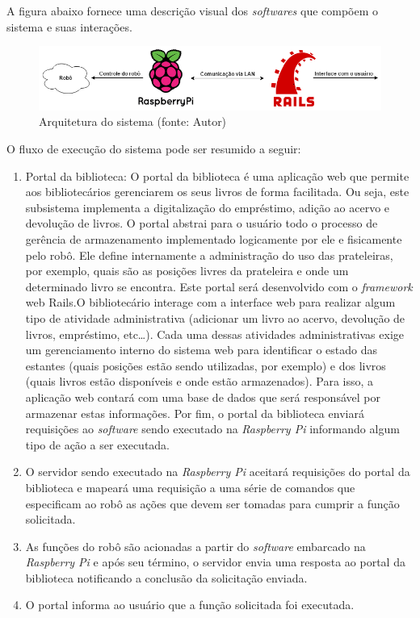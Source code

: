 A figura abaixo fornece uma descrição visual dos \textit{softwares} que compõem o sistema e suas interações.

\begin{figure}[!h]
\centering
\includegraphics[scale=0.50, angle = 360]{figuras/arquitetura_1}
\caption[]{Arquitetura do sistema (fonte: Autor)}
\end{figure}
\FloatBarrier

O fluxo de execução do sistema pode ser resumido a seguir:

\begin{enumerate}
    \item Portal da biblioteca: O portal da biblioteca é uma aplicação web que permite aos bibliotecários gerenciarem os seus livros de forma facilitada. Ou seja, este subsistema implementa a digitalização do empréstimo, adição ao acervo e devolução de livros. O portal abstrai para o usuário todo o processo de gerência de armazenamento implementado logicamente por ele e fisicamente pelo robô. Ele define internamente a administração do uso das prateleiras, por exemplo, quais são as posições livres da prateleira e onde um determinado livro se encontra. Este portal será desenvolvido com o \textit{framework} web Rails.O bibliotecário interage com a interface web para realizar algum tipo de atividade administrativa (adicionar um livro ao acervo, devolução de livros, empréstimo, etc…). Cada uma dessas atividades administrativas exige um gerenciamento interno do sistema web para identificar o estado das estantes (quais posições estão sendo utilizadas, por exemplo) e dos livros (quais livros estão disponíveis e onde estão armazenados). Para isso, a aplicação web contará com uma base de dados que será responsável por armazenar estas informações. Por fim, o portal da biblioteca enviará requisições ao \textit{software} sendo executado na \textit{Raspberry Pi} informando algum tipo de ação a ser executada.

    \item O servidor sendo executado na \textit{Raspberry Pi} aceitará requisições do portal da biblioteca e mapeará uma requisição a uma série de comandos que especificam ao robô as ações que devem ser tomadas para cumprir a função solicitada.

    \item As funções do robô são acionadas a partir do \textit{software} embarcado na \textit{Raspberry Pi} e após seu término, o servidor envia uma resposta ao portal da biblioteca notificando a conclusão da solicitação enviada.

    \item O portal informa ao usuário que a função solicitada foi executada.
\end{enumerate}

